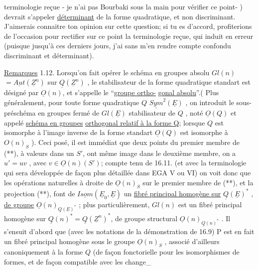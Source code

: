 
terminologie reçue  - je n'ai pas Bourbaki sous la main pour vérifier ce
point- ) devrait s'appeler \uline{déterminant} de la forme quadratique, et non
discriminant. J'aimerais connaitre ton opinion sur cette question; si
tu es d'accord,  profiterions de l'occasion pour rectifier sur ce
point la terminologie reçue, qui induit en erreur (puisque jusqu'à ces
derniers jours, j'ai sans m'en rendre compte confondu discriminant et
déterminant).

\uline{Remarques} 1.12. Lorsqu'on fait opérer le schéma en groupes absolu
$Gl(n)$  $= \underline{Aut}(\underline{Z}^n )$ sur $\underline{Q}(\underline{Z}^n)$ , le stabilisateur de la forme
quadratique standart est désigné par $\underline{O}(n)$, et s'appelle le ``\uline{groupe ortho-}%
\uline{gonal absolu}''.( Plus généralement, pour toute forme quadratique $Q$ \hand{$\in$}
 $\underline{Sym}^2(\underline{E})$ , on introduit le sous-préschéma en groupes fermé de
$Gl(\underline{E})$  stabilisateur de $Q$ , noté $\underline{O}(Q)$ et appelé \uline{schéma en groupes}
\uline{orthogonal relatif à la forme Q}; lorsque $Q$ est isomorphe à l'image
inverse de la forme standart \hand{,} $\underline{O}(Q)$ est isomorphe à $O(n)_S$ ). Ceci posé,
il est immédiat que deux points  du premier membre de (**), à valeurs dans
un $S'$, ont même image dans le deuxième membre,  
 on a $u' = uv$ , avec $v \in \underline{O}(n)(S')$; compte tenu de 16.11. (et
avec la terminologie qui sera développée de façon plus détaillée dans
EGA V ou VI) on voit donc que les opérations naturelles à droite de
$\underline{O}(n)_S$ sur le premier membre de (**), et la projection (**), font de
$\underline{Isom}(\underline{E}_0,\underline{E})$ un \uline{fibré principal homogène sur} $\underline{Q}(\underline{E})^*$ , \uline{de groupe} $\underline{O}(n)_{\underline{Q}(\underline{E})^*}$ ;
plus particulièrement,  $Gl(n)$ est un fibré principal
homogène sur $\underline{Q}(n)^* = \underline{Q}(\underline{Z}^n)^*$, de groupe structural $\underline{O}(n)_{\underline{Q}(n)^*}$ . Il
s'ensuit  d'abord que (avec les notations de la démonstration de 16.9)
P est en fait un fibré principal homogène sous le groupe $\underline{O}(n)_S$ , associé
 d'ailleurs canoniquement à la forme $Q$ (de façon fonctorielle
pour les isomorphismes de formes, et de façon compatible avec les change\_%

